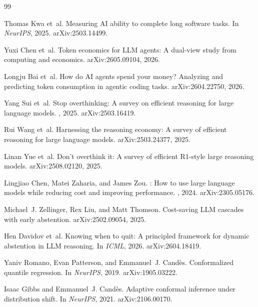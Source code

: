 \documentclass{article}
\begin{document}
\begin{ack}
\end{ack}

{\small
\begin{thebibliography}{99}

Thomas Kwa et~al.
\newblock Measuring {AI} ability to complete long software tasks.
\newblock In {\em NeurIPS}, 2025.
\newblock arXiv:2503.14499.

Yuxi Chen et~al.
\newblock Token economics for {LLM} agents: A dual-view study from computing and economics.
\newblock arXiv:2605.09104, 2026.

Longju Bai et~al.
\newblock How do {AI} agents spend your money? Analyzing and predicting token consumption in agentic coding tasks.
\newblock arXiv:2604.22750, 2026.

Yang Sui et~al.
\newblock Stop overthinking: A survey on efficient reasoning for large language models.
, 2025.
\newblock arXiv:2503.16419.

Rui Wang et~al.
\newblock Harnessing the reasoning economy: A survey of efficient reasoning for large language models.
\newblock arXiv:2503.24377, 2025.

Linan Yue et~al.
\newblock Don't overthink it: A survey of efficient {R1}-style large reasoning models.
\newblock arXiv:2508.02120, 2025.

Lingjiao Chen, Matei Zaharia, and James Zou.
: How to use large language models while reducing cost and improving performance.
, 2024.
\newblock arXiv:2305.05176.

Michael~J. Zellinger, Rex Liu, and Matt Thomson.
\newblock Cost-saving {LLM} cascades with early abstention.
\newblock arXiv:2502.09054, 2025.

Hen Davidov et~al.
\newblock Knowing when to quit: A principled framework for dynamic abstention in {LLM} reasoning.
\newblock In {\em ICML}, 2026.
\newblock arXiv:2604.18419.

Yaniv Romano, Evan Patterson, and Emmanuel~J. Cand{\`e}s.
\newblock Conformalized quantile regression.
\newblock In {\em NeurIPS}, 2019.
\newblock arXiv:1905.03222.

Isaac Gibbs and Emmanuel~J. Cand{\`e}s.
\newblock Adaptive conformal inference under distribution shift.
\newblock In {\em NeurIPS}, 2021.
\newblock arXiv:2106.00170.


\end{thebibliography}}
\end{document}
